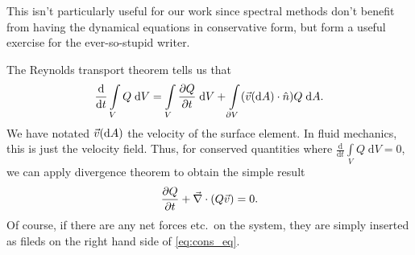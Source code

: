 \documentclass[11pt,
        usenames, %
        dvipsnames %
    ]{report}
\newcommand*{\rd}[2]{\frac{\mathrm{d}#1}{\mathrm{d}#2}}
\newcommand*{\pd}[2]{\frac{\partial#1}{\partial#2}}
\DeclarePairedDelimiter\p{\lparen}{\rparen}
\begin{document}
This isn't particularly useful for our work since spectral methods don't benefit
from having the dynamical equations in conservative form, but form a useful
exercise for the ever-so-stupid writer.

The Reynolds transport theorem tells us that
\begin{equation}
    \rd{}{t}\int\limits_V Q\;\mathrm{d}V
        = \int\limits_V \pd{Q}{t}\;\mathrm{d}V
            + \int\limits_{\partial V}
                \p*{\vec{v}\p*{\mathrm{d}A} \cdot \hat{n}} Q\;\mathrm{d}A.
\end{equation}
We have notated $\vec{v}\p*{\mathrm{d}A}$ the velocity of the surface element.
In fluid mechanics, this is just the velocity field. Thus, for conserved
quantities where $\rd{}{t}\int\limits_V Q\;\mathrm{d}V = 0$, we can apply
divergence theorem to obtain the simple result
\begin{equation}
    \pd{Q}{t} + \vec{\nabla} \cdot \p*{Q\vec{v}} = 0.\label{eq:cons_eq}
\end{equation}
Of course, if there are any net forces etc.\ on the system, they are simply
inserted as fileds on the right hand side of \autoref{eq:cons_eq}.
\end{document}
